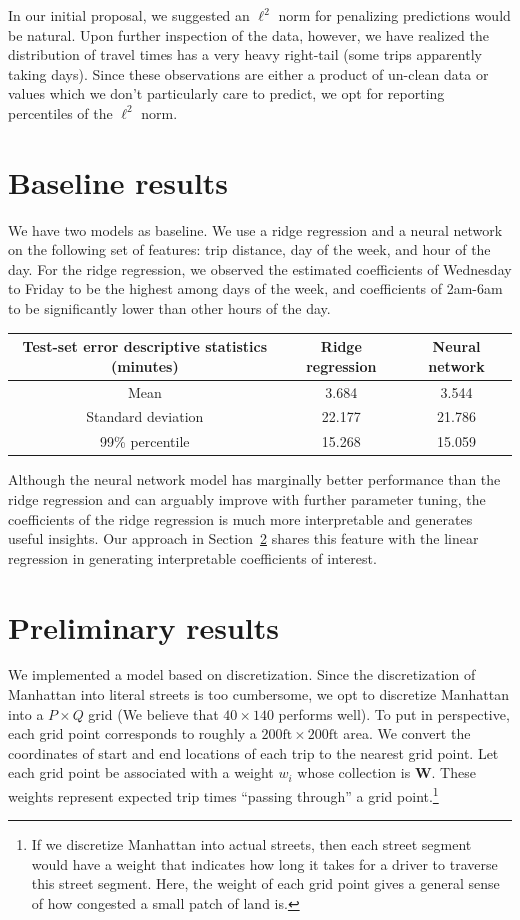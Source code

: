 \documentclass[11pt]{article}
\begin{document}
In our initial proposal, we suggested an $\ell^2$ norm for penalizing predictions would be natural. Upon further inspection of the data, however, we have realized the distribution of travel times has a very heavy right-tail (some trips apparently taking days). Since these observations are either a product of un-clean data or values which we don't particularly care to predict, we opt for reporting percentiles of the $\ell^2$ norm.

\section{Baseline results}

We have two models as baseline. We use a ridge regression and a neural network on the following set of features: trip distance, day of the week, and hour of the day. For the ridge regression, we observed the estimated coefficients of Wednesday to Friday to be the highest among days of the week, and coefficients of 2am-6am to be significantly lower than other hours of the day.
\begin{center}
\begin{tabular}{ccc}\toprule 
    Test-set error descriptive statistics (minutes) & Ridge regression & Neural network \\\midrule
    Mean & 3.684 & 3.544\\
    Standard deviation & 22.177 & 21.786\\
    99\% percentile & 15.268 & 15.059\\\bottomrule
\end{tabular}
\end{center}
Although the neural network model has marginally better performance than the ridge regression and can arguably improve with further parameter tuning, the coefficients of the ridge regression is much more interpretable and generates useful insights. Our approach in Section~\ref{results} shares this feature with the linear regression in generating interpretable coefficients of interest.


\section{Preliminary results}
\label{results}
We implemented a model based on discretization. Since the discretization of Manhattan into literal streets is too cumbersome, we opt to discretize Manhattan into a $P\times Q$ grid (We believe that $40\times 140$ performs well). To put in perspective, each grid point corresponds to roughly a $200\text{ft} \times 200\text{ft}$ area. We convert the coordinates of start and end locations of each trip to the nearest grid point. Let each grid point be associated with a weight $w_i$ whose collection is $\bm W$. These weights represent expected trip times ``passing through'' a grid point.\footnote{If we discretize Manhattan into actual streets, then each street segment would have a weight that indicates how long it takes for a driver to traverse this street segment. Here, the weight of each grid point gives a general sense of how congested a small patch of land is.} 
\end{document}
